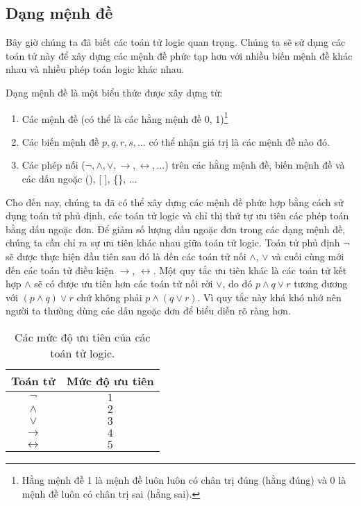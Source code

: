 \documentclass[11pt,fleqn]{book} %
\begin{document}
    \subsection{Dạng mệnh đề} 
        Bây giờ chúng ta đã biết các toán tử logic quan trọng. Chúng ta sẽ sử dụng các toán tử này để xây dựng các mệnh đề phức tạp hơn với nhiều biến mệnh đề khác nhau và nhiều phép toán logic khác nhau.
        
        \begin{definition}
            Dạng mệnh đề là một biểu thức được xây dựng từ:
            \begin{enumerate}
                \item Các mệnh đề (có thể là các hằng mệnh đề 0, 1)\footnote{
                    Hằng mệnh đề 1 là mệnh đề luôn luôn có chân trị đúng (hằng đúng) và 0 là mệnh đề luôn có chân trị sai (hằng sai).
                }
                \item Các biến mệnh đề $p, q, r, s, ...$ có thể nhận giá trị là các mệnh đề nào đó.
                \item Các phép nối ($\neg, \land, \lor, \to, \leftrightarrow, ...$) trên các hằng mệnh đề, biến mệnh đề và các dấu ngoặc (), [ ], \{\}, ...
            \end{enumerate}
        \end{definition}
        
        Cho đến nay, chúng ta đã có thể xây dựng các mệnh đề phức hợp bằng cách sử dụng toán tử phủ định, các toán tử logic và chỉ thị thứ tự ưu tiên các phép toán bằng dấu ngoặc đơn. Để giảm số lượng dấu ngoặc đơn trong các dạng mệnh đề, chúng ta cần chỉ ra sự ưu tiên khác nhau giữa toán tử logic. Toán tử phủ định $\neg$ sẽ được thực hiện đầu tiên sau đó là đến các toán tử nối $\land$, $\lor$ và cuối cùng mới đến các toán tử điều kiện $\to$, $\leftrightarrow$. Một quy tắc ưu tiên khác là các toán tử kết hợp $\land$ sẽ có được ưu tiên hơn các toán tử nối rời $\lor$, do đó $p \land q \lor r$ tương đương với $(p \land q) \lor r$ chứ không phải $p \land (q \lor r)$. Vì quy tắc này khá khó nhớ nên người ta thường dùng các dấu ngoặc đơn để biểu diễn rõ ràng hơn.
        
        \begin{table}[h!]
            \centering
            \setlength{\tabcolsep}{18pt}
            \begin{tabular}{c c}
                Toán tử & Mức độ ưu tiên \\ \hline
                $\neg$ & $1$ \\ \hline
                $\land$ & $2$ \\
                $\lor$ & $3$ \\ \hline
                $\to$ & $4$ \\
                $\leftrightarrow$ & $5$
            \end{tabular}
            \caption{Các mức độ ưu tiên của các toán tử logic.}
        \end{table}
        
\end{document}
